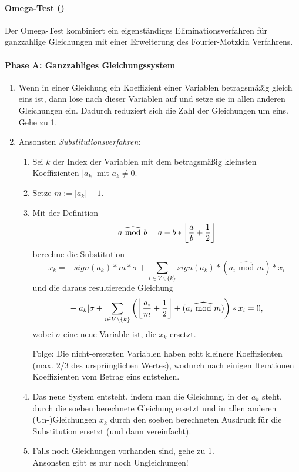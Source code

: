 \paragraph{Omega-Test (\cite{Pugh95a})}

\def\MOD{\widehat{\textrm{\ mod\ }}}
Der Omega-Test kombiniert ein eigenständiges Eliminationsverfahren für
ganzzahlige Gleichungen mit einer Erweiterung des Fourier-Motzkin
Verfahrens.

\paragraph{Phase A: Ganzzahliges Gleichungssystem}
\begin{enumerate}
\item Wenn in einer Gleichung ein Koeffizient einer Variablen
  betragsmäßig gleich eins ist, dann löse nach dieser Variablen auf
  und setze sie in allen anderen Gleichungen ein. Dadurch reduziert
  sich die Zahl der Gleichungen um eins. Gehe zu 1.
\item Ansonsten \emph{Substitutionsverfahren}:
  \begin{enumerate}
  \item Sei $k$ der Index der Variablen mit dem betragsmäßig kleinsten
    Koeffizienten $|a_k|$ mit $a_k\not=0$.
  \item Setze $m:= |a_k|+1$.
  \item Mit der Definition $$a\MOD b = a - b *
    \left\lfloor {a\over b} + {1 \over 2}\right \rfloor$$
    berechne die Substitution $$x_k = -sign(a_k)*m*\sigma +
    \sum_{i\in V\backslash\{k\}} sign(a_k)*(a_i \MOD m) * x_i$$
    und die daraus resultierende Gleichung
    $$-|a_k|\sigma + \sum_{i\in V\backslash\{k\}}\left(\left\lfloor{a_i\over
        m} + {1\over 2}\right\rfloor + (a_i\MOD m)\right) * x_i = 0,$$
    wobei $\sigma$ eine neue Variable ist, die $x_k$ ersetzt.

    Folge: Die nicht-ersetzten Variablen haben echt kleinere
    Koeffizienten (max. 2/3 des ursprünglichen Wertes), wodurch nach
    einigen Iterationen Koeffizienten vom Betrag eins entstehen.
  \item Das neue System entsteht, indem man die Gleichung, in der $a_k$
    steht, durch die soeben berechnete Gleichung ersetzt und in allen
    anderen (Un-)Gleichungen $x_k$ durch den soeben berechneten Ausdruck
    für die Substitution ersetzt (und dann vereinfacht).
  \item Falls noch Gleichungen vorhanden sind, gehe zu 1. \\
    Ansonsten gibt es nur noch Ungleichungen!
  \end{enumerate}
\setcounter{enumTemp}{\theenumi}
\end{enumerate}


